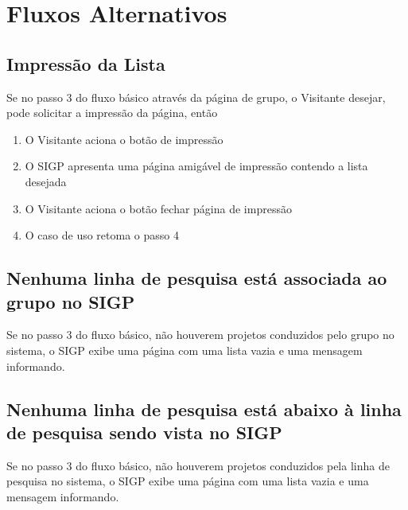 \documentclass[11pt, a4paper,oneside]{book}
\begin{document}
\section{Fluxos Alternativos}

\subsection{Impressão da Lista}
Se no passo $3$ do fluxo básico através da página de grupo, o Visitante desejar, pode solicitar a impressão da página, então

\begin{enumerate}
\item O Visitante aciona o botão de impressão
\item O SIGP apresenta uma página amigável de impressão contendo a lista desejada
\item O Visitante aciona o botão fechar página de impressão
\item O caso de uso retoma o passo 4
\end{enumerate}

\subsection{Nenhuma linha de pesquisa está associada ao grupo no SIGP}
Se no passo $3$ do fluxo básico, não houverem projetos conduzidos pelo grupo no sistema, o SIGP exibe uma página com uma lista vazia e uma mensagem informando.

\subsection{Nenhuma linha de pesquisa está abaixo à linha de pesquisa sendo vista no SIGP}
Se no passo $3$ do fluxo básico, não houverem projetos conduzidos pela linha de pesquisa no sistema, o SIGP exibe uma página com uma lista vazia e uma mensagem informando.
\end{document}
